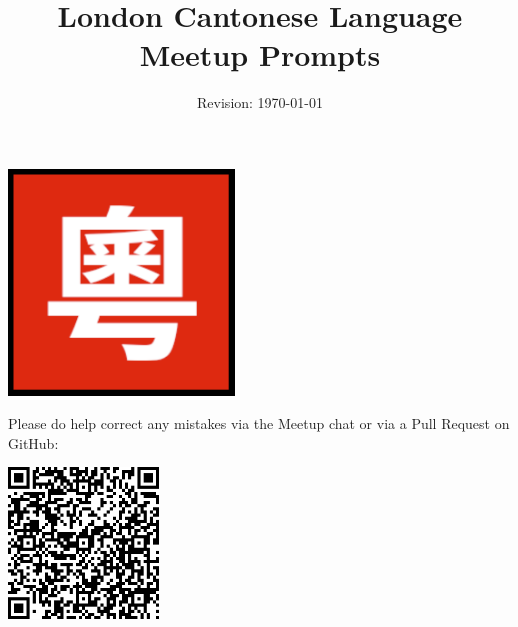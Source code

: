 \title{\vspace{-0.5cm}\large\bfseries London Cantonese Language Meetup Prompts}
\author{Revision: \today{} }
\date{}
\maketitle

\begin{center}
  \includegraphics[width=0.45\textwidth]{./assets/img/logo.png}
\end{center}

Please do help correct any mistakes via the Meetup chat or via a Pull Request on GitHub:

\begin{center}
  \includegraphics[width=0.30\textwidth]{./assets/img/github.png}
\end{center}

